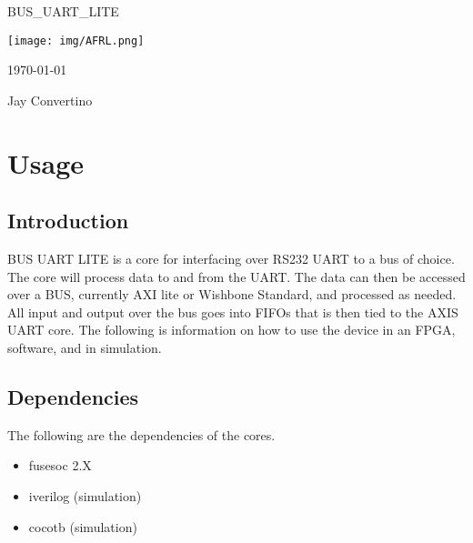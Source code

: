 \begin{titlepage}
  \begin{center}

  {\Huge BUS\_UART\_LITE}

  \vspace{25mm}

  \texttt{[image: img/AFRL.png]}

  \vspace{25mm}

  \today

  \vspace{15mm}

  {\Large Jay Convertino}

  \end{center}
\end{titlepage}

\tableofcontents

\newpage

\section{Usage}

\subsection{Introduction}

\par
BUS UART LITE is a core for interfacing over RS232 UART to a bus of choice. The core will process data to and from the UART.
The data can then be accessed over a BUS, currently AXI lite or Wishbone Standard, and processed as needed. All input and output
over the bus goes into FIFOs that is then tied to the AXIS UART core. The following is information on how to use the device
in an FPGA, software, and in simulation.

\subsection{Dependencies}

\par
The following are the dependencies of the cores.

\begin{itemize}
  \item fusesoc 2.X
  \item iverilog (simulation)
  \item cocotb (simulation)
\end{itemize}

